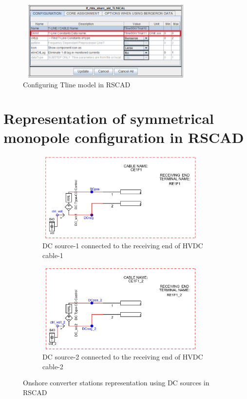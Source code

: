 \begin{figure}[H]
  \centering
  \includegraphics[height = 4cm,width = 9cm]{Diagrams/Chapter_4/TlineParaBlock_side1_mark.png}  
  \caption{Configuring Tline model in RSCAD}
  \label{fig:Tline_config_RSCAD}
\end{figure}

\section{Representation of symmetrical monopole configuration in RSCAD}\label{monopole_rep_RSCAD}
\begin{figure}[H]
\centering
\begin{subfigure}{.5\textwidth}
  \centering
  \includegraphics[height=4.5cm,width=8.5cm]{Diagrams/Chapter_4/DC_Source_Cab1.PNG}
  \caption{DC source-1 connected to the receiving end of HVDC cable-1}
  \label{DC_Source_Cab1}
\end{subfigure}%
\begin{subfigure}{.5\textwidth}
  \centering
  \includegraphics[height=4.5cm,width=8.5cm]{Diagrams/Chapter_4/DC_Source_Cab2.PNG}
  \caption{DC source-2 connected to the receiving end of HVDC cable-2}
  \label{DC_Source_Cab2}
\end{subfigure}
\caption{Onshore converter stations representation using DC sources in RSCAD}
\label{fig:DC_source_cab}
\end{figure}



